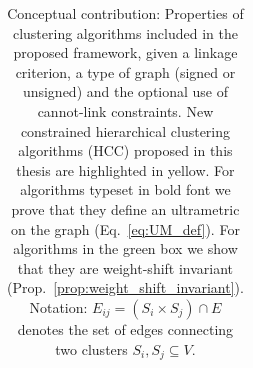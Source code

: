 \begin{table}[t]
\begin{subtable}[t!]{\textwidth}
\begin{tabular}{c |c  c  c  c  c}
            
             


             





        \end{tabular}
    \end{subtable} 
    \caption{Conceptual contribution: Properties of clustering algorithms included in the proposed \algname{} framework, given a linkage criterion, a type of graph (signed or unsigned) and the optional use of cannot-link constraints. New constrained hierarchical clustering algorithms (HCC) proposed in this thesis are highlighted in yellow. For algorithms typeset in bold font we prove that they define an ultrametric on the graph (Eq.~\ref{eq:UM_def}). For algorithms in the green box we show that they are weight-shift invariant (Prop.~\ref{prop:weight_shift_invariant}). 
    Notation: 
    $E_{ij}=(S_i \times S_{j}) \cap E$ denotes the set of edges connecting two clusters $S_i, S_j \subseteq V$. } 
    \label{tab:linkage-criteria}
\end{table}
\renewcommand\theadfont{\normalsize}


